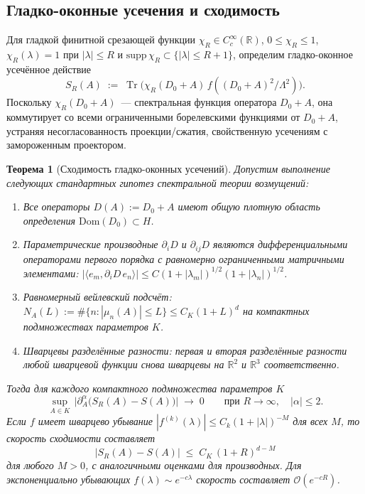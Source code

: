 \documentclass[12pt,a4paper]{article}
\theoremstyle{plain}
\newtheorem{theorem}{Теорема}[section]
\theoremstyle{definition}
\theoremstyle{remark}
\newcommand{\Tr}{\operatorname{Tr}}
\newcommand{\R}{\mathbb{R}}
\newcommand{\Lam}{\Lambda}
\newcommand{\order}{\mathcal{O}}
\begin{document}
\subsection{Гладко-оконные усечения и сходимость}
\label{subsec:smooth-window}

Для гладкой финитной срезающей функции
$\chi_R \in C_c^\infty(\R)$, $0 \le \chi_R \le 1$,
$\chi_R(\lambda) = 1$ при $|\lambda| \le R$ и
$\mathrm{supp}\,\chi_R \subset \{|\lambda| \le R+1\}$,
определим гладко-оконное усечённое действие
\begin{equation}\label{eq:smooth-window}
  S_R(A) \;:=\; \Tr\bigl(\chi_R(D_0+A)\,f((D_0+A)^2/\Lam^2)\bigr).
\end{equation}
Поскольку $\chi_R(D_0+A)$~--- спектральная функция оператора
$D_0+A$, она коммутирует со всеми ограниченными борелевскими
функциями от $D_0+A$, устраняя несогласованность
проекции/сжатия, свойственную усечениям с замороженным проектором.

\begin{theorem}[Сходимость гладко-оконных усечений]
\label{thm:smooth-convergence}
Допустим выполнение следующих стандартных гипотез спектральной
теории возмущений:
\begin{enumerate}[label=\textup{(A\arabic*)},leftmargin=3em]
  \item\label{A1} Все операторы $D(A) := D_0 + A$ имеют общую
    плотную область определения $\mathrm{Dom}(D_0) \subset H$.
  \item\label{A2} Параметрические производные $\partial_i D$ и
    $\partial_{ij} D$ являются дифференциальными операторами
    первого порядка с равномерно ограниченными матричными элементами:
    $|\langle e_m, \partial_i D\, e_n\rangle| \le C(1+|\lambda_m|)^{1/2}
    (1+|\lambda_n|)^{1/2}$.
  \item\label{A3} Равномерный вейлевский подсчёт:
    $N_A(L) := \#\{n : |\mu_n(A)| \le L\} \le C_K(1+L)^d$ на
    компактных подмножествах параметров $K$.
  \item\label{A4} Шварцевы разделённые разности: первая и вторая
    разделённые разности любой шварцевой функции снова шварцевы на
    $\R^2$ и $\R^3$ соответственно.
\end{enumerate}
Тогда для каждого компактного подмножества параметров $K$
\begin{equation}
  \sup_{A \in K}\,\bigl|\partial_A^\alpha\bigl(S_R(A) - S(A)\bigr)\bigr|
  \;\longrightarrow\; 0
  \qquad\text{при } R \to \infty,
  \quad |\alpha| \le 2.
\end{equation}
Если $f$ имеет шварцево убывание $|f^{(k)}(\lambda)| \le C_k
(1+|\lambda|)^{-M}$ для всех $M$, то скорость сходимости составляет
\begin{equation}\label{eq:convergence-rate}
  \bigl|S_R(A) - S(A)\bigr| \;\le\; C_K\,(1+R)^{d-M}
\end{equation}
для любого $M > 0$, с аналогичными оценками для производных.  Для
экспоненциально убывающих $f(\lambda) \sim e^{-c\lambda}$ скорость
составляет $\order(e^{-cR})$.
\end{theorem}
\end{document}
